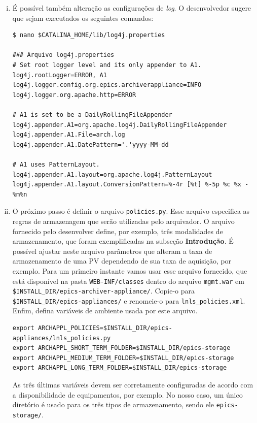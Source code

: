 \begin {enumerate}[i.]
\item É possível também alteração as configurações de \textit{log}. O
desenvolvedor sugere que sejam executados os seguintes comandos:

\begin{lstlisting}[keywordstyle=\ttfamily, style=nonumbers]
$ nano $CATALINA_HOME/lib/log4j.properties

### Arquivo log4j.properties
# Set root logger level and its only appender to A1.
log4j.rootLogger=ERROR, A1
log4j.logger.config.org.epics.archiverappliance=INFO
log4j.logger.org.apache.http=ERROR

# A1 is set to be a DailyRollingFileAppender
log4j.appender.A1=org.apache.log4j.DailyRollingFileAppender
log4j.appender.A1.File=arch.log
log4j.appender.A1.DatePattern='.'yyyy-MM-dd

# A1 uses PatternLayout.
log4j.appender.A1.layout=org.apache.log4j.PatternLayout
log4j.appender.A1.layout.ConversionPattern=%-4r [%t] %-5p %c %x - %m%n
\end{lstlisting}

\item O próximo passo é definir o arquivo \texttt{policies.py}. Esse arquivo
especifica as regras de armazenagem que serão utilizadas pelo arquivador. O
arquivo fornecido pelo desenvolver define, por exemplo, três modalidades de
armazenamento, que foram exemplificadas na subseção \textbf{Introdução}. É
possível ajustar neste arquivo parâmetros que alteram a taxa de armazenamento de
uma PV dependendo de sua taxa de aquisição, por exemplo. Para um primeiro
instante vamos usar esse arquivo fornecido, que está disponível na pasta
\texttt{WEB-INF/classes} dentro do arquivo \texttt{mgmt.war} em
\texttt{\$INSTALL\_DIR/epics-archiver-appliance/}. Copie-o para
\texttt{\$INSTALL\_DIR/epics-appliances/} e renomeie-o para
\texttt{lnls\_policies.xml}. Enfim, defina variáveis de ambiente usada por este
arquivo.

\begin{lstlisting}[keywordstyle=\ttfamily, style=nonumbers]
export ARCHAPPL_POLICIES=$INSTALL_DIR/epics-appliances/lnls_policies.py
export ARCHAPPL_SHORT_TERM_FOLDER=$INSTALL_DIR/epics-storage
export ARCHAPPL_MEDIUM_TERM_FOLDER=$INSTALL_DIR/epics-storage
export ARCHAPPL_LONG_TERM_FOLDER=$INSTALL_DIR/epics-storage
\end{lstlisting}

As três últimas variáveis devem ser corretamente configuradas de acordo com a
disponibilidade de equipamentos, por exemplo. No nosso caso, um único diretório
é usado para os três tipos de armazenamento, sendo ele \texttt{epics-storage/}.


\end{enumerate}
